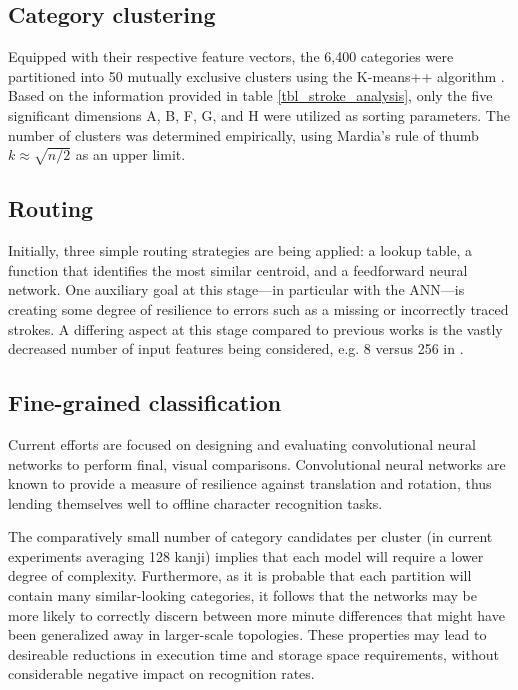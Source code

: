 \documentclass[10pt,conference,a4paper]{IEEEtran}
\begin{document}
	\subsection{Category clustering}

	Equipped with their respective feature vectors, the 6,400 categories were partitioned into 50
	mutually exclusive clusters using the K-means++ algorithm \cite{arthur2007k}.
	Based on the information provided
	in table \ref{tbl_stroke_analysis}, only the five significant dimensions A, B, F, G, and H were utilized as sorting parameters.
	The number of clusters was determined empirically, using Mardia's rule of thumb \mbox{$k \approx \sqrt{n / 2}$} \cite{mardia2005multivariate}
	as an upper limit.
	

	\subsection{Routing}

	Initially, three simple routing strategies are being applied: a lookup table, a function that
	identifies the most similar centroid, and a feedforward neural network. One auxiliary goal
	at this stage---in particular with the ANN---is creating some degree of resilience to errors
	such as a missing or incorrectly traced strokes.
	A differing aspect at this stage compared to previous works is the vastly decreased number
	of input features being considered, e.g. 8 versus 256 in \cite{yang2003accelerating}.


	\subsection{Fine-grained classification}

	Current efforts are focused on designing and evaluating convolutional neural networks to perform final, visual comparisons.
	\mbox{Convolutional} neural networks are known to provide a measure of resilience against translation and rotation,
	thus lending themselves well to offline character recognition tasks.
	
	The comparatively small number of category candidates per cluster (in current experiments averaging 128 kanji)
	implies that each model will require a lower degree of complexity. Furthermore, as it is probable that each
	partition will contain many similar-looking categories, it follows that the networks may be more likely to correctly
	discern between more minute differences that might have been generalized away in larger-scale topologies.
	These properties may lead to desireable reductions in execution time and storage space requirements,
	without considerable negative impact on recognition rates.
\end{document}
